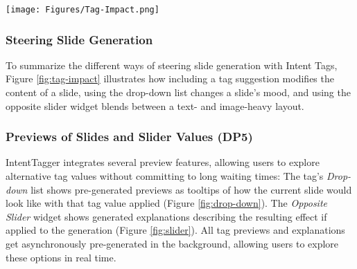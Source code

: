 \begin{figure*}[h!]
  \centering
  \texttt{[image: Figures/Tag-Impact.png]}
  \caption{Examples of steering GenAI slide generation with Intent Tags: (A) Influencing the detail level of the displayed information, (B) steering the "mood" from "bright" to "dark," or (C) gradually blending the layout between text- and image-heavy.    }
  \label{fig:tag-impact}
\end{figure*}


\subsubsection{\textbf{Steering Slide Generation}}

To summarize the different ways of steering slide generation with Intent Tags, Figure \ref{fig:tag-impact} illustrates how including a tag suggestion modifies the content of a slide, using the drop-down list changes a slide's mood, and using the opposite slider widget blends between a text- and image-heavy layout.  


\subsubsection{\textbf{Previews of Slides and Slider Values (DP5)}}
IntentTagger integrates several preview features, allowing users to explore alternative tag values without committing to long waiting times: The tag's \textit{Drop-down} list shows pre-generated previews as tooltips of how the current slide would look like with that tag value applied (Figure \ref{fig:drop-down}). 
The \textit{Opposite Slider} widget shows generated explanations describing the resulting effect if applied to the generation (Figure \ref{fig:slider}). All tag previews and explanations get asynchronously pre-generated in the background, allowing users to explore these options in real time. 




